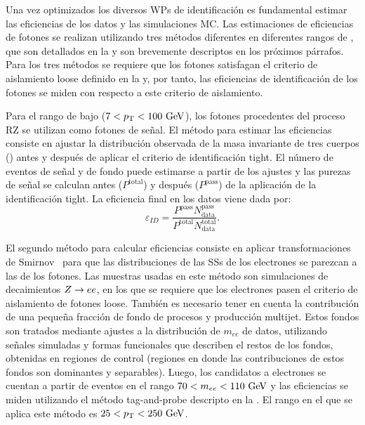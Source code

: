 Una vez optimizados los diversos \acp{WP} de identificación es fundamental estimar las eficiencias de los datos y las simulaciones \ac{MC}. Las estimaciones de eficiencias de fotones se realizan utilizando tres métodos diferentes en diferentes rangos de \pt, que son detallados en la  y son brevemente descriptos en los próximos párrafos.
Para los tres métodos se requiere que los fotones satisfagan el criterio de aislamiento loose definido en la \Sect{\ref{subsec:objects:egamma:iso}} y, por tanto, las eficiencias de identificación de los fotones se miden con respecto a este criterio de aislamiento. 

Para el rango de bajo \pt (\(7<p_{\text{T}}<100~\text{GeV}\)), los fotones procedentes del proceso \ac{RZ} se utilizan como fotones de señal. El método para estimar las eficiencias consiste en ajustar la distribución observada de la masa invariante de tres cuerpos (\mlly) antes y después de aplicar el criterio de identificación tight. El número de eventos de señal y de fondo puede estimarse a partir de los ajustes y las purezas de señal se calculan antes (\(P^{\text{total}}\)) y después (\(P^{\text{pass}}\)) de la aplicación de la identificación tight.
La eficiencia final en los datos viene dada por:
\begin{equation*}
    \varepsilon_{ID} = \frac{ P^{\text{pass}} N_{\text{data}}^{\text{pass}} }{ P^{\text{total}} N_{\text{data}}^{\text{total}} }.
\end{equation*}

El segundo método para calcular eficiencias consiste en aplicar transformaciones de Smirnov~\cite{SmirnovTransform} para que las distribuciones de las \acp{SS} de los electrones se parezcan a las de los fotones. Las muestras usadas en este método son simulaciones de decaimientos \(Z\rightarrow ee\), en los que se requiere que los electrones pasen el criterio de aislamiento de fotones loose. También es necesario tener en cuenta la contribución de una pequeña fracción de fondo de procesos \Wjets y producción multijet. Estos fondos son tratados mediante ajustes a la distribución de \(m_{ee}\) de datos, utilizando señales simuladas y formas funcionales que describen el restos de los fondos, obtenidas en regiones de control (regiones en donde las contribuciones de estos fondos son dominantes y separables). Luego, los candidatos a electrones se cuentan a partir de eventos en el rango \(70 < m_{ee} < 110~\text{GeV}\) y las eficiencias se miden utilizando el método tag-and-probe descripto en la . El rango \pt en el que se aplica este método es \(25<p_{\text{T}}<250~\text{GeV}\).

